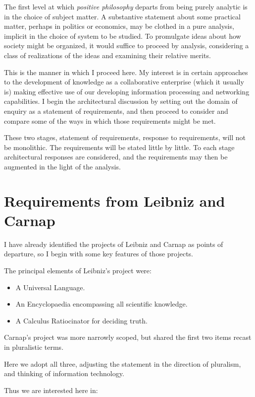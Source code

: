 The first level at which \emph{positive philosophy} departs from being
purely analytic is in the choice of subject matter.
A substantive statement about some practical matter, perhaps in
politics or economics, may be clothed in a pure analysis, implicit in
the choice of system to be studied.
To promulgate ideas about how society might be organized, it would
suffice to proceed by analysis, considering a class of realizations of
the ideas and examining their relative merits.

This is the manner in which I proceed here.
My interest is in certain approaches to the development of knowledge
as a collaborative enterprise (which it usually is) making effective use
of our developing information processing and networking capabilities.
I begin the architectural discussion by setting out the domain of
enquiry as a statement of requirements, and then proceed to consider
and compare some of the ways in which those requirements might be met.

These two stages, statement of requirements, response to requirements,
will not be monolithic.
The requirements will be stated little by little.
To each stage architectural responses are considered, and the
requirements may then be augmented in the light of the analysis.

\section{Requirements from Leibniz and Carnap}

I have already identified the projects of Leibniz and Carnap as points
of departure, so I begin with some key features of those projects.

The principal elements of Leibniz's project were:

\begin{itemize}
\item A Universal Language.
\item An Encyclopaedia encompassing all scientific knowledge.
\item A Calculus Ratiocinator for deciding truth.
\end{itemize}

Carnap's project was more narrowly scoped, but shared the first two
items recast in pluralistic terms.

Here we adopt all three, adjusting the statement in the direction of
pluralism, and thinking of information technology.

Thus we are interested here in:

